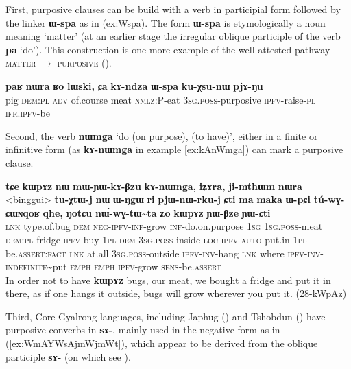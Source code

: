 \documentclass[oldfontcommands,oneside,a4paper,11pt]{article}
\newcommand{\ipa}[1]{\mbox{\phon\textbf{#1}}} %
\begin{document}
   First, purposive clauses can be build with a verb in participial form followed by the linker \ipa{ɯ-spa} as in ({ex:Wspa}).  The form \ipa{ɯ-spa} is etymologically a noun meaning `matter' (at an earlier stage the irregular oblique participle of the verb \ipa{pa} `do'). This construction is one more example of the well-attested pathway \textsc{matter} $\rightarrow$ \textsc{purposive} (\citealt[212]{heine-kuteva02}).


\begin{exe}
\ex \label{ex:Wspa}
\gll \ipa{paʁ} 	\ipa{nɯra} 	\ipa{ʁo} 	\ipa{lɯski,} 	\ipa{ɕa} 	\ipa{kɤ-ndza} 	\ipa{ɯ-spa} 	\ipa{ku-χsu-nɯ} 	\ipa{pjɤ-ŋu}  \\
pig \textsc{dem:pl} \textsc{adv} of.course meat \textsc{nmlz}:P-eat \textsc{3sg.poss}-purposive \textsc{ipfv}-raise-\textsc{pl} \textsc{ifr.ipfv}-be \\
\glt 
\end{exe}
 
Second, the verb \ipa{nɯmga} `do (on purpose), (to have)', either in a finite or infinitive form (as \ipa{kɤ-nɯmga}  in example \ref{ex:kAnWmga}) can mark a purposive clause.

\begin{exe}
\ex \label{ex:kAnWmga}
\gll 
\ipa{tɕe} 	\ipa{kɯpɤz} 	\ipa{nɯ} 	\ipa{mɯ-ɲɯ-kɤ-βzu} 	\ipa{kɤ-nɯmga,} 	\ipa{iʑɤra,} \ipa{ji-mthɯm} 	\ipa{nɯra} 	<binggui> 	\ipa{tu-χtɯ-j} \ipa{nɯ} 	\ipa{ɯ-ŋgɯ} 	\ipa{ri} 	\ipa{pjɯ-nɯ-rku-j} 	\ipa{ɕti} 	\ipa{ma} \ipa{maka} 	\ipa{ɯ-pɕi} 	\ipa{tú-wɣ-ɕɯɴqoʁ} 	\ipa{qhe,} \ipa{ŋotɕu} 	\ipa{nɯ́-wɣ-tɯ\textasciitilde{}ta} 	\ipa{ʑo} 	\ipa{kɯpɤz} 	\ipa{ɲɯ-βze} 	\ipa{ɲɯ-ɕti}\\
\textsc{lnk} type.of.bug \textsc{dem} \textsc{neg-ipfv-inf}-grow \textsc{inf}-do.on.purpose \textsc{1sg} \textsc{1sg.poss}-meat \textsc{dem:pl} fridge \textsc{ipfv}-buy-\textsc{1pl} \textsc{dem} \textsc{3sg.poss}-inside \textsc{loc} \textsc{ipfv-auto}-put.in-\textsc{1pl} be.\textsc{assert:fact} \textsc{lnk} at.all \textsc{3sg.poss}-outside \textsc{ipfv-inv}-hang \textsc{lnk} where \textsc{ipfv-inv}-\textsc{indefinite}\textasciitilde{}put \textsc{emph} \textsc{emph} \textsc{ipfv}-grow \textsc{sens}-be.\textsc{assert}\\
\glt In order not to have \ipa{kɯpɤz} bugs, our meat, we bought a fridge and put it in there, as if one hangs it outside, bugs will grow wherever you put it. (28-kWpAz)
\end{exe}
 

Third, Core Gyalrong languages, including Japhug (\citealt{jacques14linking}) and Tshobdun (\citealt{sun12complementation}) have purposive converbs in \ipa{sɤ-}, mainly used in the negative form as in (\ref{ex:WmAYWsAjmWjmWt}), which appear to be derived from the oblique participle \ipa{sɤ-} (on which see \citealt{jacques16relatives}).
 
\end{document}
